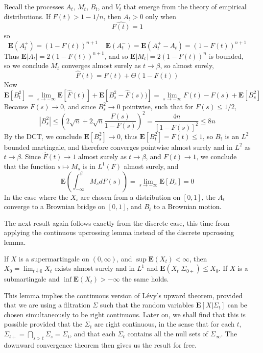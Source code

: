 \begin{example}
    Recall the processes $A_t$, $M_t$, $B_t$, and $V_t$ that emerge from the theory of empirical distributions. If $F(t) > 1 - 1/n$, then $A_t > 0$ only when
    \[ \widehat{F(t)} = 1 \]
    so
    \[ \mathbf{E}(A_t^+) = (1 - F(t))^{n+1}\ \ \ \ \ \mathbf{E}(A_t^-) = \mathbf{E}(A_t^+ - A_t) = (1 - F(t))^{n+1} \]
    Thus $\mathbf{E}|A_t| = 2(1 - F(t))^{n+1}$, and so $\mathbf{E}|M_t| = 2(1 - F(t))^n$ is bounded, so we conclude $M_t$ converges almost surely as $t \to \beta$, so almost surely,
    \[ \widehat{F}(t) = F(t) + \Theta(1 - F(t)) \]
    Now
    \[ \mathbf{E}[B_t^2] = \lim_{s \to -\infty} \mathbf{E}[\widehat{F}(t)] + \mathbf{E}[B_s^2 - \widehat{F}(s))] = \lim_{s \to -\infty} F(t) - F(s) + \mathbf{E}[B_s^2] \]
    Because $F(s) \to 0$, and since $B_s^2 \to 0$ pointwise, such that for $F(s) \leq 1/2$,
    \[ |B_s^2| \leq \left( 2\sqrt{n} + 2\sqrt{n} \frac{F(s)}{1 - F(s)} \right)^2 = \frac{4n}{[1 - F(s)]^2} \leq 8n \]
    By the DCT, we conclude $\mathbf{E}[B_s^2] \to 0$, thus $\mathbf{E}[B_t^2] = F(t) \leq 1$, so $B_t$ is an $L^2$ bounded \cadlag martingale, and therefore converges pointwise almost surely and in $L^2$ as $t \to \beta$. Since $\widehat{F}(t) \to 1$ almost surely as $t \to \beta$, and $F(t) \to 1$, we conclude that the function $s \mapsto M_s$ is in $L^1(F)$ almost surely, and
    \[ \mathbf{E} \left( \int_{-\infty}^\beta M_s dF(s) \right) = \lim_{s \to -\infty} \mathbf{E}[B_s] = 0 \]
    In the case where the $X_i$ are chosen from a distribution on $[0,1]$, the $A_t$ converge to a Brownian bridge on $[0,1]$, and $B_t$ to a Brownian motion.
\end{example}

The next result again follows exactly from the discrete case, this time from applying the continuous upcrossing lemma instead of the discrete upcrossing lemma.

\begin{theorem}
    If $X$ is a \cadlag supermartingale on $(0,\infty)$, and $\sup \mathbf{E}(X_t) < \infty$, then $X_0 = \lim_{t \downarrow 0} X_t$ exists almost surely and in $L^1$ and $\mathbf{E}(X_t|\Sigma_{0+}) \leq X_0$. If $X$ is a submartingale and $\inf \mathbf{E}(X_t) > -\infty$ the same holds.
\end{theorem}

This lemma implies the continuous version of L\'{e}vy's upward theorem, provided that we are using a filtration $\Sigma$ such that the random variables $\mathbf{E}[X|\Sigma_t]$ can be chosen simultaneously to be right continuous. Later on, we shall find that this is possible provided that the $\Sigma_t$ are right continuous, in the sense that for each $t$, $\Sigma_{t+} = \bigcap_{s > t} \Sigma_s = \Sigma_t$, and that each $\Sigma_t$ contains all the null sets of $\Sigma_\infty$. The downward convergence theorem then gives us the result for free.

